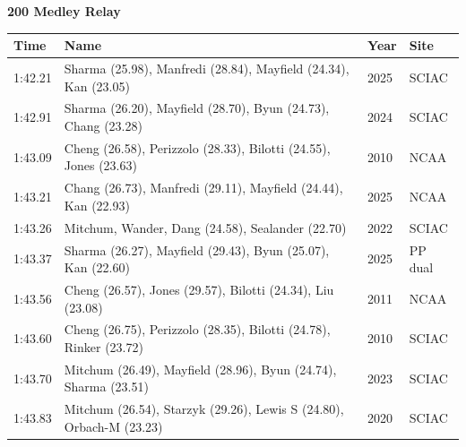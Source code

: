 \noindent\begin{minipage}[t]{0.98\textwidth}
\centering
\textbf{\textcolor{teamprimary}{200 Medley Relay}}\par
\vspace{0.5em}
\centering
\small
\renewcommand{\arraystretch}{1.0}
\setlength{\tabcolsep}{4pt}
\begin{tabular}{@{}p{2.7cm}p{4.3cm}p{1.6cm}p{2.7cm}@{}}
\toprule
\textbf{Time} & \textbf{Name} & \textbf{Year} & \textbf{Site} \\
\midrule
1:42.21 & Sharma (25.98), Manfredi (28.84), Mayfield (24.34), Kan (23.05) & 2025 & SCIAC \\
1:42.91 & Sharma (26.20), Mayfield (28.70), Byun (24.73), Chang (23.28) & 2024 & SCIAC \\
1:43.09 & Cheng (26.58), Perizzolo (28.33), Bilotti (24.55), Jones (23.63) & 2010 & NCAA \\
1:43.21 & Chang (26.73), Manfredi (29.11), Mayfield (24.44), Kan (22.93) & 2025 & NCAA \\
1:43.26 & Mitchum, Wander, Dang (24.58), Sealander (22.70) & 2022 & SCIAC \\
1:43.37 & Sharma (26.27), Mayfield (29.43), Byun (25.07), Kan (22.60) & 2025 & PP dual \\
1:43.56 & Cheng (26.57), Jones (29.57), Bilotti (24.34), Liu (23.08) & 2011 & NCAA \\
1:43.60 & Cheng (26.75), Perizzolo (28.35), Bilotti (24.78), Rinker (23.72) & 2010 & SCIAC \\
1:43.70 & Mitchum (26.49), Mayfield (28.96), Byun (24.74), Sharma (23.51) & 2023 & SCIAC \\
1:43.83 & Mitchum (26.54), Starzyk (29.26), Lewis S (24.80), Orbach-M (23.23) & 2020 & SCIAC \\
\bottomrule
\end{tabular}
\end{minipage}
\vspace{1.2em}
